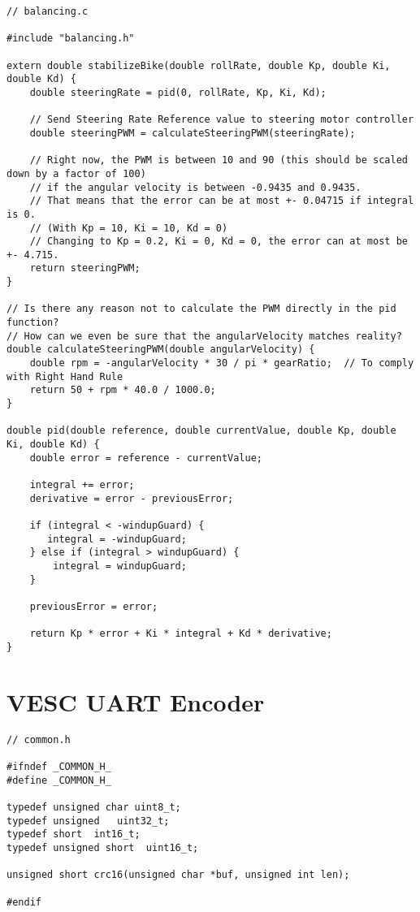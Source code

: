 \begin{lstlisting}
// balancing.c

#include "balancing.h"

extern double stabilizeBike(double rollRate, double Kp, double Ki, double Kd) {
    double steeringRate = pid(0, rollRate, Kp, Ki, Kd);

    // Send Steering Rate Reference value to steering motor controller
    double steeringPWM = calculateSteeringPWM(steeringRate);

    // Right now, the PWM is between 10 and 90 (this should be scaled down by a factor of 100)
    // if the angular velocity is between -0.9435 and 0.9435.
    // That means that the error can be at most +- 0.04715 if integral is 0.
    // (With Kp = 10, Ki = 10, Kd = 0)
    // Changing to Kp = 0.2, Ki = 0, Kd = 0, the error can at most be +- 4.715.
    return steeringPWM;
}

// Is there any reason not to calculate the PWM directly in the pid function?
// How can we even be sure that the angularVelocity matches reality?
double calculateSteeringPWM(double angularVelocity) {
    double rpm = -angularVelocity * 30 / pi * gearRatio;  // To comply with Right Hand Rule
    return 50 + rpm * 40.0 / 1000.0;
}

double pid(double reference, double currentValue, double Kp, double Ki, double Kd) {
    double error = reference - currentValue;

    integral += error;
    derivative = error - previousError;

    if (integral < -windupGuard) {
       integral = -windupGuard;
    } else if (integral > windupGuard) {
        integral = windupGuard;
    }

    previousError = error;

    return Kp * error + Ki * integral + Kd * derivative;
}
\end{lstlisting}

\newpage

\section{VESC UART Encoder}

\begin{lstlisting}
// common.h

#ifndef _COMMON_H_
#define _COMMON_H_

typedef unsigned char uint8_t;
typedef unsigned   uint32_t;
typedef short  int16_t;
typedef unsigned short  uint16_t;

unsigned short crc16(unsigned char *buf, unsigned int len);

#endif
\end{lstlisting}

